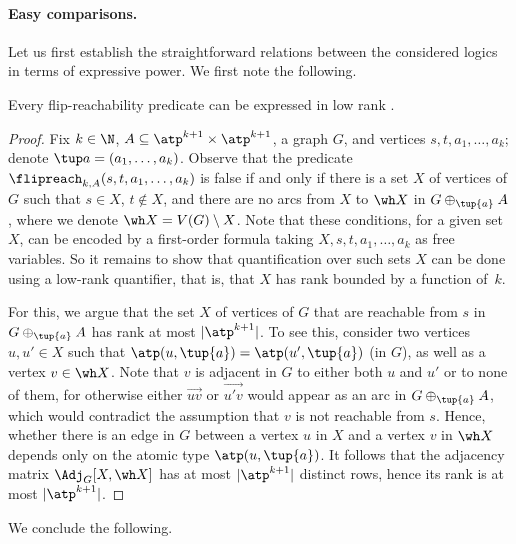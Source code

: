 \paragraph*{Easy comparisons.} Let us first establish the straightforward relations between the considered logics in terms of expressive power. We first note the following.

\begin{lemma}\label{lem:freach-in-lrmso}
    Every flip-reachability predicate can be expressed in low rank \mso.
\end{lemma}
\begin{proof}
    Fix $k\in \N$, $A \subseteq \atp^{k+1} \times \atp^{k+1}$, a graph $G$, and vertices $s,t,a_1,\ldots,a_k$; denote $\tup a=(a_1,\ldots,a_k)$.
    Observe that the predicate $\flipreach_{k, A}(s, t, a_1, \ldots, a_k)$ is false if and only if there is a set $X$ of vertices of $G$ such that $s\in X$, $t\notin X$, and there are no arcs from $X$ to $\wh X$ in $G \oplus_{\tup{a}} A$, where we denote $\wh X=V(G)\setminus X$.
    Note that these conditions, for a given set $X$, can be encoded by a first-order formula taking $X,s,t,a_1,\ldots,a_k$ as free variables.
    So it remains to show that quantification over such sets $X$ can be done using a low-rank quantifier, that is, that $X$ has rank bounded by a function of~$k$.

    For this, we argue that the set $X$ of vertices of $G$ that are reachable from $s$ in $G \oplus_{\tup{a}} A$ has rank at most $|\atp^{k+1}|$.
    To see this, consider two vertices $u,u'\in X$ such that $\atp(u, \tup{a}) = \atp(u', \tup{a})$ (in $G$), as well as a vertex $v\in \wh X$. Note that $v$ is adjacent in $G$ to either both $u$ and $u'$ or to none of them, for otherwise either $\vec{uv}$ or $\vec{u'v}$ would appear as an arc in $G \oplus_{\tup{a}} A$, which would contradict the assumption that $v$ is not reachable from $s$.
    Hence, whether there is an edge in $G$ between a vertex $u$ in $X$ and a vertex $v$ in $\wh X$ depends only on the atomic type $\atp(u,\tup{a})$. It follows that the adjacency matrix $\Adj_G[X, \wh X]$ has at most $|\atp^{k+1}|$ distinct rows, hence its rank is at most $|\atp^{k+1}|$.
\end{proof}

We conclude the following.

